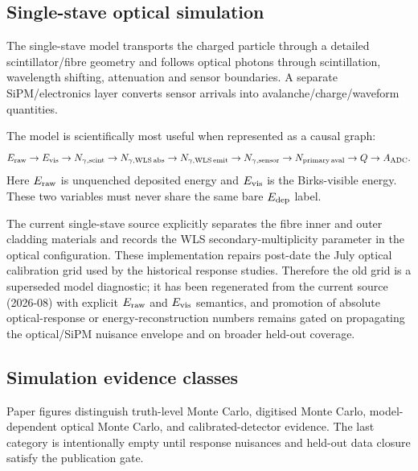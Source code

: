 \subsection{Single-stave optical simulation}

The single-stave model transports the charged particle through a detailed scintillator/fibre geometry and follows optical photons through scintillation, wavelength shifting, attenuation and sensor boundaries. A separate SiPM/electronics layer converts sensor arrivals into avalanche/charge/waveform quantities.

The model is scientifically most useful when represented as a causal graph:
\[
E_{\rm raw}\rightarrow E_{\rm vis}\rightarrow N_{\gamma,\rm scint}
\rightarrow N_{\gamma,\rm WLS\,abs}\rightarrow N_{\gamma,\rm WLS\,emit}
\rightarrow N_{\gamma,\rm sensor}\rightarrow N_{\rm primary\,aval}
\rightarrow Q\rightarrow A_{\rm ADC}.
\]
Here \(E_{\rm raw}\) is unquenched deposited energy and \(E_{\rm vis}\) is the Birks-visible energy. These two variables must never share the same bare \(E_{\rm dep}\) label.

The current single-stave source explicitly separates the fibre inner and outer cladding materials and records the WLS secondary-multiplicity parameter in the optical configuration. These implementation repairs post-date the July optical calibration grid used by the historical response studies. Therefore the old grid is a superseded model diagnostic; it has been regenerated from the current source (2026-08) with explicit $E_{\rm raw}$ and $E_{\rm vis}$ semantics, and promotion of absolute optical-response or energy-reconstruction numbers remains gated on propagating the optical/SiPM nuisance envelope and on broader held-out coverage.

\subsection{Simulation evidence classes}

Paper figures distinguish truth-level Monte Carlo, digitised Monte Carlo, model-dependent optical Monte Carlo, and calibrated-detector evidence. The last category is intentionally empty until response nuisances and held-out data closure satisfy the publication gate.
